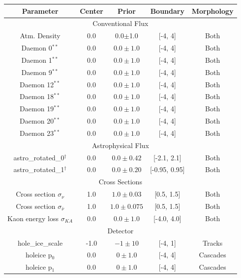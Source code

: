 \documentclass[main.tex]{subfiles}
\begin{document}
\begin{table}
    \centering
    \begin{tabular}{c | cccc}\rowcolor{blue!25}
        {\large \textbf{Parameter}} & {\large \textbf{Center}} & {\large \textbf{Prior}} & {\large \textbf{Boundary}}& {\large \textbf{Morphology}} \\ \hline
        \multicolumn{5}{c}{Conventional Flux} \\\hline
        Atm. Density & 0.0 & 0.0$\pm$1.0 & [-4, 4] & Both \\
        Daemon 0$^{**}$  & 0.0 & $0.0\pm1.0$ & [-4, 4]& Both  \\
        Daemon 1$^{**}$  & 0.0 & $0.0\pm1.0$ & [-4, 4]& Both  \\
        Daemon 9$^{**}$  & 0.0 & $0.0\pm1.0$ & [-4, 4]& Both  \\
        Daemon 12$^{**}$  & 0.0 & $0.0\pm1.0$ & [-4, 4]& Both  \\
        Daemon 18$^{**}$  & 0.0 & $0.0\pm1.0$ & [-4, 4]& Both  \\
        Daemon 19$^{**}$  & 0.0 & $0.0\pm1.0$ & [-4, 4]& Both  \\
        Daemon 20$^{**}$  & 0.0 & $0.0\pm1.0$ & [-4, 4]& Both  \\
        Daemon 23$^{**}$  & 0.0 & $0.0\pm1.0$ & [-4, 4]& Both  \\
        \multicolumn{5}{c}{Astrophysical Flux} \\\hline
        astro\_rotated\_0$^{\dag}$ & 0.0 & $0.0\pm 0.42 $ & [-2.1, 2.1]&Both  \\
        astro\_rotated\_1$^{\dag}$ & 0.0 & $0.0\pm0.20$ & [-0.95, 0.95]&Both  \\
        \multicolumn{5}{c}{Cross Sections} \\\hline
        Cross section $\sigma_{\nu}$ & 1.0 & $1.0\pm0.03$ & [0.5, 1.5]& Both \\
        Cross section $\sigma_{\bar{\nu}}$ & 1.0 & $1.0\pm0.075$ & [0.5, 1.5]& Both \\
        Kaon energy loss $\sigma_{KA}$ & 0.0 & $0.0\pm1.0$ & [-4.0, 4.0]& Both \\
        \multicolumn{5}{c}{Detector} \\\hline 
        hole\_ice\_scale & -1.0 & $-1\pm10$ & [-4, 1]&Tracks  \\
        holeice p$_{0}$ & 0.0 & $0\pm 1.0$ & [-4, 4]&Cascades \\
        holeice p$_{1}$ & 0.0 & $0\pm 1.0$ & [-4, 4]&Cascades  \\

\end{tabular}
\end{table}
\end{document}
